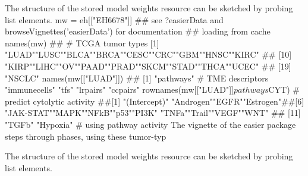 The structure of the stored model weights resource can be sketched by probing list elements.
mw = eh[["EH6678"]]
## see ?easierData and browseVignettes('easierData') for documentation
## loading from cache
names(mw)
##
# TCGA tumor types
[1] "LUAD""LUSC""BLCA""BRCA""CESC""CRC""GBM""HNSC""KIRC"
## [10] "KIRP""LIHC""OV""PAAD""PRAD""SKCM""STAD""THCA""UCEC"
## [19] "NSCLC"
names(mw[["LUAD"]])
## [1] "pathways"
# TME descriptors
"immunecells" "tfs"
"lrpairs"
"ccpairs"
rownames(mw[["LUAD"]]$pathways$CYT) # predict cytolytic activity
##[1] "(Intercept)" "Androgen""EGFR""Estrogen"##[6] "JAK-STAT""MAPK""NFkB""p53""PI3K"
"TNFa""Trail""VEGF""WNT"
## [11] "TGFb"
"Hypoxia"
# using pathway activity
The vignette of the easier package steps through phases, using these tumor-typ

\begin{Shaded}
\begin{Highlighting}[]
\NormalTok{()}
\end{Highlighting}
\end{Shaded}

The structure of the stored model weights resource can
be sketched by probing list elements.

